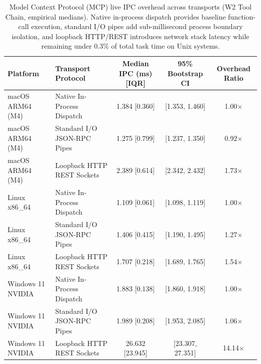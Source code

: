 \begin{table}[t]
\centering
\small
\caption{Model Context Protocol (MCP) live IPC overhead across transports (W2 Tool Chain, empirical medians). Native in-process dispatch provides baseline function-call execution, standard I/O pipes add sub-millisecond process boundary isolation, and loopback HTTP/REST introduces network stack latency while remaining under $0.3\%$ of total task time on Unix systems.}
\label{tab:mcp_transport_ablation}
\begin{tabular}{llccc}
\toprule
\textbf{Platform} & \textbf{Transport Protocol} & \textbf{Median IPC (ms) [IQR]} & \textbf{95\% Bootstrap CI} & \textbf{Overhead Ratio} \\
\midrule
macOS ARM64 (M4) & Native In-Process Dispatch & 1.384 [0.360] & [1.353, 1.460] & 1.00$\times$ \\
macOS ARM64 (M4) & Standard I/O JSON-RPC Pipes & 1.275 [0.799] & [1.237, 1.350] & 0.92$\times$ \\
macOS ARM64 (M4) & Loopback HTTP REST Sockets & 2.389 [0.614] & [2.342, 2.432] & 1.73$\times$ \\
\midrule
Linux x86_64 & Native In-Process Dispatch & 1.109 [0.061] & [1.098, 1.119] & 1.00$\times$ \\
Linux x86_64 & Standard I/O JSON-RPC Pipes & 1.406 [0.415] & [1.190, 1.495] & 1.27$\times$ \\
Linux x86_64 & Loopback HTTP REST Sockets & 1.707 [0.218] & [1.689, 1.765] & 1.54$\times$ \\
\midrule
Windows 11 NVIDIA & Native In-Process Dispatch & 1.883 [0.138] & [1.860, 1.918] & 1.00$\times$ \\
Windows 11 NVIDIA & Standard I/O JSON-RPC Pipes & 1.989 [0.208] & [1.953, 2.085] & 1.06$\times$ \\
Windows 11 NVIDIA & Loopback HTTP REST Sockets & 26.632 [23.945] & [23.307, 27.351] & 14.14$\times$ \\
\midrule
\bottomrule
\end{tabular}
\end{table}
